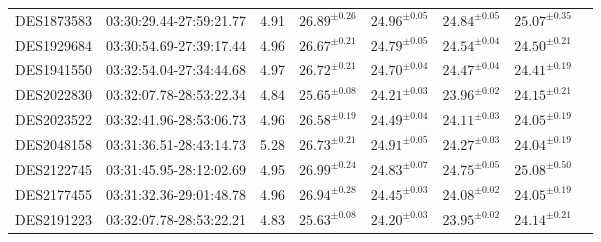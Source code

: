 {\begin{ThreePartTable}
\begin{longtable}{lccccccl}
DES1873583 & 03:30:29.44-27:59:21.77 & 4.91 & $26.89^{ \pm 0.26}$ & $24.96^{ \pm 0.05}$ & $24.84^{ \pm 0.05}$ & $25.07^{ \pm 0.35}$ & \tnote{d} \\
DES1929684 & 03:30:54.69-27:39:17.44 & 4.96 & $26.67^{ \pm 0.21}$ & $24.79^{ \pm 0.05}$ & $24.54^{ \pm 0.04}$ & $24.50^{ \pm 0.21}$ & \\
DES1941550 & 03:32:54.04-27:34:44.68 & 4.97 & $26.72^{ \pm 0.21}$ & $24.70^{ \pm 0.04}$ & $24.47^{ \pm 0.04}$ & $24.41^{ \pm 0.19}$ & \\
DES2022830 & 03:32:07.78-28:53:22.34 & 4.84 & $25.65^{ \pm 0.08}$ & $24.21^{ \pm 0.03}$ & $23.96^{ \pm 0.02}$ & $24.15^{ \pm 0.21}$ & \tnote{e} \\
DES2023522 & 03:32:41.96-28:53:06.73 & 4.96 & $26.58^{ \pm 0.19}$ & $24.49^{ \pm 0.04}$ & $24.11^{ \pm 0.03}$ & $24.05^{ \pm 0.19}$ & \\
DES2048158 & 03:31:36.51-28:43:14.73 & 5.28 & $26.73^{ \pm 0.21}$ & $24.91^{ \pm 0.05}$ & $24.27^{ \pm 0.03}$ & $24.04^{ \pm 0.19}$ & \\
DES2122745 & 03:31:45.95-28:12:02.69 & 4.95 & $26.99^{ \pm 0.24}$ & $24.83^{ \pm 0.07}$ & $24.75^{ \pm 0.05}$ & $25.08^{ \pm 0.50}$ & \\
DES2177455 & 03:31:32.36-29:01:48.78 & 4.96 & $26.94^{ \pm 0.28}$ & $24.45^{ \pm 0.03}$ & $24.08^{ \pm 0.02}$ & $24.05^{ \pm 0.19}$ & \\
DES2191223 & 03:32:07.78-28:53:22.21 & 4.83 & $25.63^{ \pm 0.08}$ & $24.20^{ \pm 0.03}$ & $23.95^{ \pm 0.02}$ & $24.14^{ \pm 0.21}$ & \tnote{e} \\


\end{longtable}
\end{ThreePartTable}

\clearpage

\begin{ThreePartTable}
\centering
\onehalfspacing
\footnotesize


\end{ThreePartTable}}
